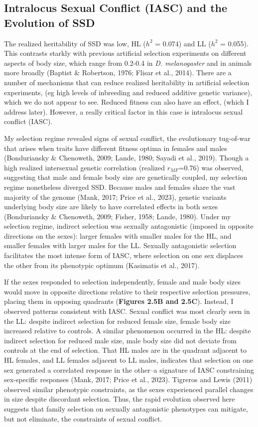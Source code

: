 \documentclass[12pt,reqno,oneside]{report}
\begin{document}
\subsection{Intralocus Sexual Conflict (IASC) and the Evolution of SSD}

The realized heritability of SSD was low, HL (\(h^2\) = 0.074) and LL (\(h^2\) = 0.055). This contrasts starkly with previous artificial selection experiments on different aspects of body size, which range from 0.2-0.4 in \textit{D. melanogaster} and in animals more broadly (Baptist \& Robertson, 1976; Flisar et al., 2014).  There are a number of mechanisms that can reduce realized heritability in artificial selection experiments, (eg high levels of inbreeding and reduced additive genetic variance), which we do not appear to see. Reduced fitness can also have an effect, (which I address later). However, a really critical factor in this case is intralocus sexual conflict (IASC).

My selection regime revealed signs of sexual conflict, the evolutionary tug-of-war that arises when traits have different fitness optima in females and males (Bonduriansky \& Chenoweth, 2009; Lande, 1980; Sayadi et al., 2019). Though a high realized intersexual genetic correlation (realized \(r_{MF}\)=0.76) was observed, suggesting that male and female body size are genetically coupled, my selection regime nonetheless diverged SSD. Because males and females share the vast majority of the genome (Mank, 2017; Price et al., 2023), genetic variants underlying body size are likely to have correlated effects in both sexes (Bonduriansky \& Chenoweth, 2009; Fisher, 1958; Lande, 1980). Under my selection regime, indirect selection was sexually antagonistic (imposed in opposite directions on the sexes): larger females with smaller males for the HL, and smaller females with larger males for the LL. Sexually antagonistic selection facilitates the most intense form of IASC, where selection on one sex displaces the other from its phenotypic optimum (Kasimatis et al., 2017).

If the sexes responded to selection independently, female and male body sizes would move in opposite directions relative to their respective selection pressures, placing them in opposing quadrants (\textbf{Figures 2.5B and 2.5C}). Instead, I observed patterns consistent with IASC. Sexual conflict was most clearly seen in the LL: despite indirect selection for reduced female size, female body size increased relative to controls. A similar phenomenon occurred in the HL: despite indirect selection for reduced male size, male body size did not deviate from controls at the end of selection. That HL males are in the quadrant adjacent to HL females, and LL females adjacent to LL males, indicates that selection on one sex generated a correlated response in the other--a signature of IASC constraining sex-specific responses (Mank, 2017; Price et al., 2023). Tigreros and Lewis (2011) observed similar phenotypic constraints, as the sexes experienced parallel changes in size despite discordant selection. Thus, the rapid evolution observed here suggests that family selection on sexually antagonistic phenotypes can mitigate, but not eliminate, the constraints of sexual conflict.
\end{document}
